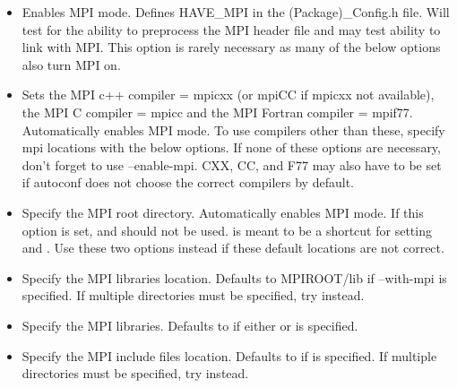 \documentclass[12pt,relax]{TrilinosDevGuide}
\begin{document}
\begin{itemize}
\item {}

Enables MPI mode. Defines HAVE\_MPI in the (Package)\_Config.h file. Will test 
for the ability to preprocess the MPI header file and may test ability to link 
with MPI.  This option is rarely necessary as many of the below options also 
turn MPI on.  

\item {}

Sets the MPI c++ compiler = mpicxx (or mpiCC if mpicxx not available), 
the MPI C compiler = mpicc and the MPI Fortran compiler = mpif77.  
Automatically enables MPI mode.  To use compilers other than these, 
specify mpi locations with the below options.  If none of these options 
are necessary, don't forget to use --enable-mpi.  CXX, CC, and F77 may also 
have to be set if autoconf does not choose the correct compilers by default.

\item {}

Specify the MPI root directory. Automatically enables MPI mode.  If this 
option is set,  and 
 should not be used.  
 is meant to be a shortcut for setting 
and .  Use these two options instead if 
these default locations are not correct.

\item {}

Specify the MPI libraries location. Defaults to MPIROOT/lib if --with-mpi 
is specified. If multiple directories must be specified, try 
 instead. 

\item {} 

Specify the MPI libraries. Defaults to 
 if either or 
 is specified.

\item {}

Specify the MPI include files location. Defaults to  if 
 is specified. If multiple directories  must be specified, try 
 instead.
\end{itemize}
\end{document}
